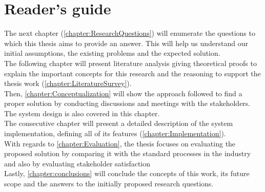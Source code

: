 \section{Reader's guide}\label{sec:guide}
\indent The next chapter (\autoref{chapter:ResearchQuestions}) will enumerate the questions to which this thesis aims to provide an answer. This will help us understand our initial assumptions, the existing problems and the expected solution.
\\\indent The following chapter will present literature analysis giving theoretical proofs to explain the important concepts for this research and the reasoning to support the thesis work (\autoref{chapter:LiteratureSurvey}).
\\\indent Then, \autoref{chapter:Conceptualization} will show the approach followed to find a proper solution by conducting discussions and meetings with the stakeholders. The system design is also covered in this chapter. 
\\\indent The consecutive chapter will present a detailed description of the system implementation, defining all of its features (\autoref{chapter:Implementation}).
\\\indent With regards to \autoref{chapter:Evaluation}, the thesis focuses on evaluating the proposed solution by comparing it with the standard processes in the industry and also by evaluating stakeholder satisfaction
\\\indent Lastly, \autoref{chapter:conclusions} will conclude the concepts of this work, its future scope and the answers to the initially proposed research questions.


